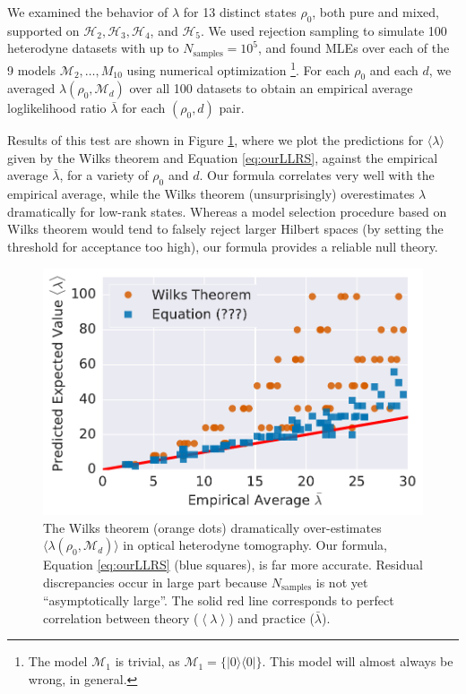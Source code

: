 \documentclass[aps,pra, twocolumn]{revtex4-1}
\newcommand{\M}{\mathcal{M}}
\newcommand{\expect}[1]{\ensuremath{\left\langle#1\right\rangle}}
\begin{document}
We examined the behavior of $\lambda$ for 13 distinct states $\rho_{0}$, both pure and mixed, supported on $\mathcal{H}_{2}, \mathcal{H}_{3}, \mathcal{H}
_{4}$, and $\mathcal{H}_{5}$.  We used rejection sampling to simulate 100 heterodyne datasets with up to $N_{\mathrm{samples}}=10^5$, and found MLEs over each of the 9 models $\M_2, \ldots, M_{10}$ using numerical optimization \footnote{The model $\M_{1}$ is trivial, as $\M_{1} = \{|0\rangle \langle 0|\}$. This model will almost always be wrong, in general.}.  For each $\rho_{0}$ and each $d$, we averaged $\lambda(\rho_{0}, \M_{d})$ over all 100 datasets to obtain an empirical average loglikelihood ratio $\bar{\lambda}$ for each $(\rho_0,d)$ pair.

Results of this test are shown in Figure \ref{fig:modelcomp}, where we plot the predictions for $\langle \lambda \rangle$ given by the Wilks theorem and Equation \eqref{eq:ourLLRS}, against the empirical average $\bar\lambda$, for a variety of $\rho_{0}$ and $d$. Our formula correlates very well with the empirical average, while the Wilks theorem (unsurprisingly) overestimates $\lambda$ dramatically for low-rank states.  Whereas a model selection procedure based on Wilks theorem would tend to falsely reject larger Hilbert spaces (by setting the threshold for acceptance too high), our formula provides a reliable null theory.

\begin{figure}[h]
 \includegraphics[width=\columnwidth]{Images/Figure_8.pdf}
 \caption{The Wilks theorem (orange dots) dramatically over-estimates $\langle\lambda(\rho_{0}, \M_{d})\rangle$ in optical heterodyne tomography. Our formula, Equation \ref{eq:ourLLRS} (blue squares), is far more accurate. Residual discrepancies occur in large part because $N_{\mathrm{samples}}$ is not yet ``asymptotically large''. The solid red line corresponds to perfect correlation between theory ($\expect{\lambda}$) and practice ($\bar\lambda$).}
 \label{fig:modelcomp}
\end{figure}
\end{document}
